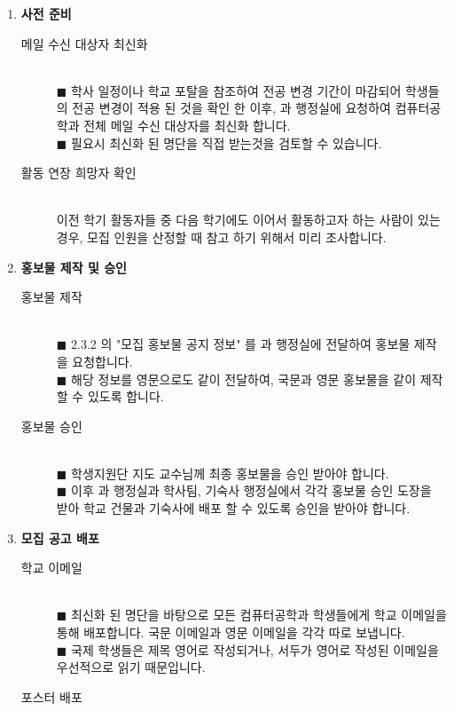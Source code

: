 \begin{enumerate}
    \item \textbf{사전 준비}
    \begin{description}
        \item[메일 수신 대상자 최신화] \text{  }\\
        $\blacksquare$ 학사 일정이나 학교 포탈을 참조하여 전공 변경 기간이 마감되어 학생들의 전공 변경이 적용 된 것을 확인 한 이후, 과 행정실에 요청하여 컴퓨터공학과 전체 메일 수신 대상자를 최신화 합니다.\\
        $\blacksquare$ 필요시 최신화 된 명단을 직접 받는것을 검토할 수 있습니다.
        \item[활동 연장 희망자 확인] \text{  }\\
        이전 학기 활동자들 중 다음 학기에도 이어서 활동하고자 하는 사람이 있는 경우, 모집 인원을 산정할 때 참고 하기 위해서 미리 조사합니다.
    \end{description}
    \item \textbf{홍보물 제작 및 승인}
    \begin{description}
        \item[홍보물 제작] \text{  }\\
        $\blacksquare$ 2.3.2 의 "모집 홍보물 공지 정보" 를 과 행정실에 전달하여 홍보물 제작을 요청합니다.\\
        $\blacksquare$ 해당 정보를 영문으로도 같이 전달하여, 국문과 영문 홍보물을 같이 제작할 수 있도록 합니다.
        \item[홍보물 승인] \text{  }\\
        $\blacksquare$ 학생지원단 지도 교수님께 최종 홍보물을 승인 받아야 합니다.\\
        $\blacksquare$ 이후 과 행정실과 학사팀, 기숙사 행정실에서 각각 홍보물 승인 도장을 받아 학교 건물과 기숙사에 배포 할 수 있도록 승인을 받아야 합니다.
    \end{description}
    \item \textbf{모집 공고 배포}
    \begin{description}
        \item[학교 이메일] \text{  }\\
        $\blacksquare$ 최신화 된 명단을 바탕으로 모든 컴퓨터공학과 학생들에게 학교 이메일을 통해 배포합니다. 국문 이메일과 영문 이메일을 각각 따로 보냅니다.\\
        $\blacksquare$ 국제 학생들은 제목 영어로 작성되거나, 서두가 영어로 작성된 이메일을 우선적으로 읽기 때문입니다.
        \item[포스터 배포] \text{  }\\

\end{description}
\end{enumerate}
